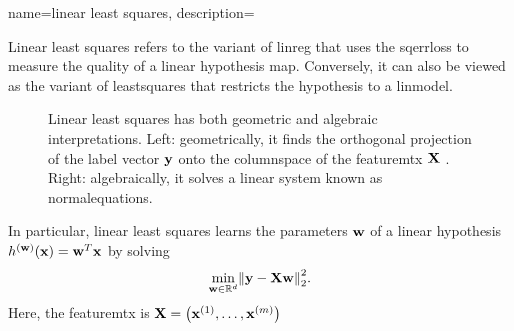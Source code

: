 {name={linear least squares},
 description={
Linear least squares refers to the 
 variant of \gls{linreg} that uses the \gls{sqerrloss} to measure the quality of 
 a linear \gls{hypothesis} \gls{map}. Conversely, it can also be viewed as the 
 variant of \gls{leastsquares} that restricts the \gls{hypothesis} to a 
 \gls{linmodel}. 
  \begin{figure}
 	\centering
 \caption{Linear least squares has both geometric and algebraic interpretations. 
 Left: geometrically, it finds the orthogonal projection of the 
 \gls{label} \gls{vector} ${\bf y}$ onto the \gls{columnspace} of the 
 \gls{featuremtx} ${\bf X}$ \cite[Ch. 8]{BoydConvexBook}. Right: algebraically, it solves a linear system 
 known as \gls{normalequations}. 
 \label{fig_linleastsquares_dict}}
 \end{figure}
 In particular, linear least squares learns the \glspl{parameter} ${\bf w}$ of a 
  linear \gls{hypothesis} 
  $h^{({\bf w})}({\bf x}) = {\bf w}^{T} {\bf x}$ by solving 
  \begin{equation} 
 	\label{eq_linleastsquares_dic}
 	\min_{\weights \in \mathbb{R}^{\nrfeatures}} \normgeneric{\labelvec - \featuremtx \weights}{2}^2.
  \end{equation} 
  Here, the \gls{featuremtx} is 
  ${\bf X} = \big({\bf x}^{(1)},\ldots,{\bf x}^{(m)}\big)$ 
}}

